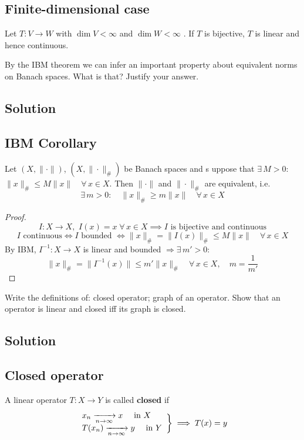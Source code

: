 \subsection{Finite-dimensional case}
Let $T:V\to W$ with $\dim V < \infty$ and  $\dim W < \infty$ .
If $T$ is bijective, $T $ is linear and hence continuous.


\question
By the IBM theorem we can infer an important property about equivalent norms on Banach spaces. What is that? Justify your answer.

\subsection*{Solution}

\subsection{IBM Corollary} 
Let $(X,\|\cdot\|)$, $(X,\|\cdot\|_\#)$ be Banach spaces and s uppose that $\exists\,M>0:$ $\|x\|_\#\leq M\|x\|\quad\forall\,x\in X$. \newline 
Then $\|\cdot\|$ and $\|\cdot\|_\#$ are equivalent, i.e. 
\[\exists\,m>0:\quad \|x\|_\#\geq m\|x\|\quad\forall\,x\in X\]
\begin{proof}
    \[I:X\rightarrow X,\,\, I(x)=x \; \forall\,x\in X \implies I \text{ is bijective and continuous}\]
    \[I \text{ continuous} \iff I \text{ bounded } \iff \|x\|_\#=\|I(x)\|_\#\leq M\|x\|\quad\forall\,x\in X\]
    By IBM, $I^{-1}:X\rightarrow X$ is linear and bounded $\Rightarrow \exists\,m'>0:$
    \[\|x\|_\#=\|I^{-1}(x)\|\leq m'\|x\|_\#\quad \forall\,x\in X,\quad m=\frac{1}{m'}\]
\end{proof}


\question
Write the definitions of: closed operator; graph of an operator. Show that an operator is linear and closed iff its graph is closed.

\subsection*{Solution}

\subsection{Closed operator}
A linear operator $T:X\rightarrow Y$ is called \textbf{closed} if
\[
    \begin{array}{l}
        x_n\xrightarrow[n\to\infty]{}x\quad\mbox{ in } X \\
        T(x_n)\xrightarrow[n\to\infty]{}y\quad\mbox{ in } Y
    \end{array}\bigg\}\implies T(x)=y
\]

